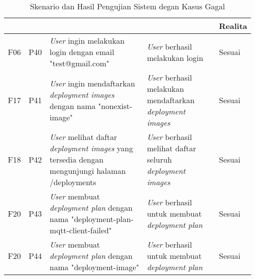 \bgroup
\begin{table}[ht]
  \def\arraystretch{1.3}
  \caption{Skenario dan Hasil Pengujian Sistem degan Kasus Gagal}
  \label{tab:pengujian-sistem-gagal}
  \centering
  \begin{tabular}{|p{2cm}|p{2cm}|p{3cm}|p{3cm}|p{1.5cm}|}
    \hline
    \centering{ID Fungsional} & \centering{ID Pengujian} & \centering{Skenario}                                                                                                                & \centering{Ekspektasi}                                                                                                            & Realita \\
    \hline
    F06                       & P40                      & \textit{User} ingin melakukan login dengan email  "test@gmail.com"                                                                  & \textit{User} berhasil melakukan login                                                                                            & Sesuai  \\
    \hline
    F17                       & P41                      & \textit{User} ingin mendaftarkan \textit{deployment images} dengan nama "nonexist-image"                                            & \textit{User} berhasil melakukan mendaftarkan \textit{deployment images}                                                          & Sesuai  \\
    \hline
    F18                       & P42                      & \textit{User} melihat daftar  \textit{deployment images} yang tersedia dengan mengunjungi halaman /deployments                      & \textit{User} berhasil melihat daftar seluruh \textit{deployment images}                                                          & Sesuai  \\
    \hline
    F20                       & P43                      & \textit{User} membuat \textit{deployment plan} dengan nama "deployment-plan-mqtt-client-failed"                                     & \textit{User} berhasil untuk membuat \textit{deployment} \textit{plan}                                                            & Sesuai  \\
    \hline
    F20                       & P44                      & \textit{User} membuat \textit{deployment plan} dengan nama "deployment-image"                                                       & \textit{User} berhasil untuk membuat \textit{deployment} \textit{plan}                                                            & Sesuai  \\

\end{tabular}
\end{table}
